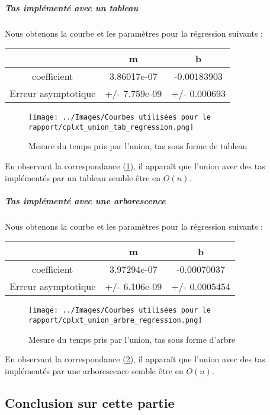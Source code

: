 \documentclass[12pt,a4paper]{article}
\begin{document}
\subparagraph{Tas implémenté avec un tableau}

Nous obtenons la courbe et les paramètres pour la régression suivants : 


\begin{center}
\begin{tabular}{|c|c|c|}
\hline
 & m & b \\
\hline
coefficient & 3.86017e-07 & -0.00183903 \\
Erreur asymptotique & +/- 7.759e-09 & +/- 0.000693  \\
\hline
\end{tabular}
\end{center}


\begin{figure}[hbtp]
\centering
\texttt{[image: ../Images/Courbes utilisées pour le rapport/cplxt\_union\_tab\_regression.png]}
\caption{Mesure du temps pris par l'union, tas sous forme de tableau}
\label{fig5}
\end{figure}

En observant la correspondance (\ref{fig5}), il apparaît que l'union avec des tas implémentés par un tableau semble être en $O(n)$.


\subparagraph{Tas implémenté avec une arborescence}

Nous obtenons la courbe et les paramètres pour la régression suivants : 


\begin{center}
\begin{tabular}{|c|c|c|}
\hline
 & m & b \\
\hline
coefficient & 3.97294e-07 &-0.00070037 \\
Erreur asymptotique & +/- 6.106e-09 & +/- 0.0005454  \\
\hline
\end{tabular}
\end{center}


\begin{figure}[hbtp]
\centering
\texttt{[image: ../Images/Courbes utilisées pour le rapport/cplxt\_union\_arbre\_regression.png]}
\caption{Mesure du temps pris par l'union, tas sous forme d'arbre}
\label{fig6}
\end{figure}

En observant la correspondance (\ref{fig6}), il apparaît que l'union avec des tas implémentés par une arborescence semble être en $O(n)$.


\subsection{Conclusion sur cette partie}
\end{document}
